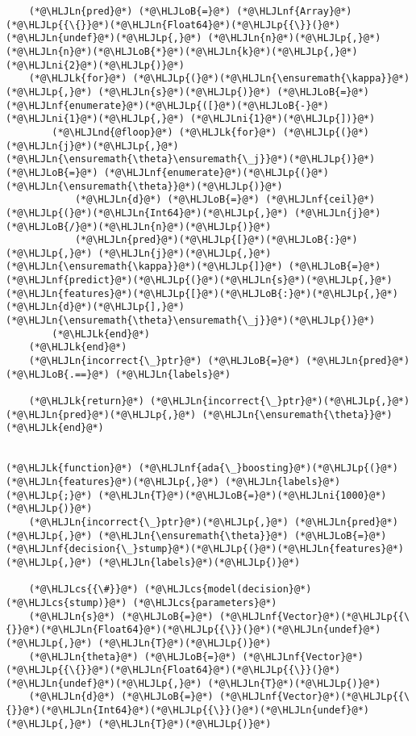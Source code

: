 \documentclass[12pt,a4paper]{article}
\newcommand{\HLJLk}[1]{\textcolor[RGB]{148,91,176}{\textbf{#1}}}
\newcommand{\HLJLn}[1]{#1}
\newcommand{\HLJLnd}[1]{\textcolor[RGB]{214,102,97}{#1}}
\newcommand{\HLJLnf}[1]{\textcolor[RGB]{66,102,213}{#1}}
\newcommand{\HLJLni}[1]{\textcolor[RGB]{59,151,46}{#1}}
\newcommand{\HLJLoB}[1]{\textcolor[RGB]{102,102,102}{\textbf{#1}}}
\newcommand{\HLJLp}[1]{#1}
\newcommand{\HLJLcs}[1]{\textcolor[RGB]{153,153,119}{\textit{#1}}}
\begin{document}
\begin{lstlisting}
    (*@\HLJLn{pred}@*) (*@\HLJLoB{=}@*) (*@\HLJLnf{Array}@*)(*@\HLJLp{{\{}}@*)(*@\HLJLn{Float64}@*)(*@\HLJLp{{\}}(}@*)(*@\HLJLn{undef}@*)(*@\HLJLp{,}@*) (*@\HLJLn{n}@*)(*@\HLJLp{,}@*) (*@\HLJLn{n}@*)(*@\HLJLoB{*}@*)(*@\HLJLn{k}@*)(*@\HLJLp{,}@*) (*@\HLJLni{2}@*)(*@\HLJLp{)}@*)
    (*@\HLJLk{for}@*) (*@\HLJLp{(}@*)(*@\HLJLn{\ensuremath{\kappa}}@*)(*@\HLJLp{,}@*) (*@\HLJLn{s}@*)(*@\HLJLp{)}@*) (*@\HLJLoB{=}@*) (*@\HLJLnf{enumerate}@*)(*@\HLJLp{([}@*)(*@\HLJLoB{-}@*)(*@\HLJLni{1}@*)(*@\HLJLp{,}@*) (*@\HLJLni{1}@*)(*@\HLJLp{])}@*)
        (*@\HLJLnd{@floop}@*) (*@\HLJLk{for}@*) (*@\HLJLp{(}@*)(*@\HLJLn{j}@*)(*@\HLJLp{,}@*) (*@\HLJLn{\ensuremath{\theta}\ensuremath{\_j}}@*)(*@\HLJLp{)}@*) (*@\HLJLoB{=}@*) (*@\HLJLnf{enumerate}@*)(*@\HLJLp{(}@*)(*@\HLJLn{\ensuremath{\theta}}@*)(*@\HLJLp{)}@*)
            (*@\HLJLn{d}@*) (*@\HLJLoB{=}@*) (*@\HLJLnf{ceil}@*)(*@\HLJLp{(}@*)(*@\HLJLn{Int64}@*)(*@\HLJLp{,}@*) (*@\HLJLn{j}@*)(*@\HLJLoB{/}@*)(*@\HLJLn{n}@*)(*@\HLJLp{)}@*)
            (*@\HLJLn{pred}@*)(*@\HLJLp{[}@*)(*@\HLJLoB{:}@*)(*@\HLJLp{,}@*) (*@\HLJLn{j}@*)(*@\HLJLp{,}@*) (*@\HLJLn{\ensuremath{\kappa}}@*)(*@\HLJLp{]}@*) (*@\HLJLoB{=}@*) (*@\HLJLnf{predict}@*)(*@\HLJLp{(}@*)(*@\HLJLn{s}@*)(*@\HLJLp{,}@*) (*@\HLJLn{features}@*)(*@\HLJLp{[}@*)(*@\HLJLoB{:}@*)(*@\HLJLp{,}@*) (*@\HLJLn{d}@*)(*@\HLJLp{],}@*) (*@\HLJLn{\ensuremath{\theta}\ensuremath{\_j}}@*)(*@\HLJLp{)}@*)
        (*@\HLJLk{end}@*) 
    (*@\HLJLk{end}@*)
    (*@\HLJLn{incorrect{\_}ptr}@*) (*@\HLJLoB{=}@*) (*@\HLJLn{pred}@*) (*@\HLJLoB{.==}@*) (*@\HLJLn{labels}@*)

    (*@\HLJLk{return}@*) (*@\HLJLn{incorrect{\_}ptr}@*)(*@\HLJLp{,}@*) (*@\HLJLn{pred}@*)(*@\HLJLp{,}@*) (*@\HLJLn{\ensuremath{\theta}}@*)
(*@\HLJLk{end}@*)


(*@\HLJLk{function}@*) (*@\HLJLnf{ada{\_}boosting}@*)(*@\HLJLp{(}@*)(*@\HLJLn{features}@*)(*@\HLJLp{,}@*) (*@\HLJLn{labels}@*)(*@\HLJLp{;}@*) (*@\HLJLn{T}@*)(*@\HLJLoB{=}@*)(*@\HLJLni{1000}@*)(*@\HLJLp{)}@*)
    (*@\HLJLn{incorrect{\_}ptr}@*)(*@\HLJLp{,}@*) (*@\HLJLn{pred}@*)(*@\HLJLp{,}@*) (*@\HLJLn{\ensuremath{\theta}}@*) (*@\HLJLoB{=}@*) (*@\HLJLnf{decision{\_}stump}@*)(*@\HLJLp{(}@*)(*@\HLJLn{features}@*)(*@\HLJLp{,}@*) (*@\HLJLn{labels}@*)(*@\HLJLp{)}@*)
    
    (*@\HLJLcs{{\#}}@*) (*@\HLJLcs{model(decision}@*) (*@\HLJLcs{stump)}@*) (*@\HLJLcs{parameters}@*)
    (*@\HLJLn{s}@*) (*@\HLJLoB{=}@*) (*@\HLJLnf{Vector}@*)(*@\HLJLp{{\{}}@*)(*@\HLJLn{Float64}@*)(*@\HLJLp{{\}}(}@*)(*@\HLJLn{undef}@*)(*@\HLJLp{,}@*) (*@\HLJLn{T}@*)(*@\HLJLp{)}@*)
    (*@\HLJLn{theta}@*) (*@\HLJLoB{=}@*) (*@\HLJLnf{Vector}@*)(*@\HLJLp{{\{}}@*)(*@\HLJLn{Float64}@*)(*@\HLJLp{{\}}(}@*)(*@\HLJLn{undef}@*)(*@\HLJLp{,}@*) (*@\HLJLn{T}@*)(*@\HLJLp{)}@*)
    (*@\HLJLn{d}@*) (*@\HLJLoB{=}@*) (*@\HLJLnf{Vector}@*)(*@\HLJLp{{\{}}@*)(*@\HLJLn{Int64}@*)(*@\HLJLp{{\}}(}@*)(*@\HLJLn{undef}@*)(*@\HLJLp{,}@*) (*@\HLJLn{T}@*)(*@\HLJLp{)}@*)


\end{lstlisting}
\end{document}
